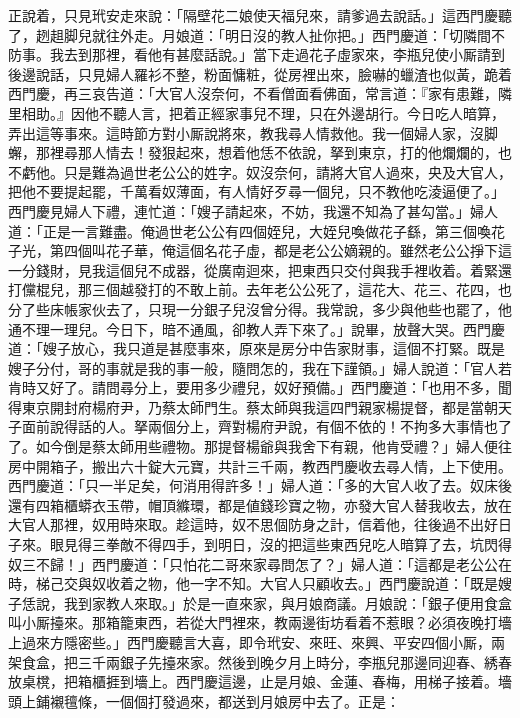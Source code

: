 正說着，只見玳安走來說：「隔壁花二娘使天福兒來，請爹過去說話。」這西門慶聽了，趔趄脚兒就往外走。月娘道：「明日沒的教人扯你把。」西門慶道：「切隣間不防事。我去到那裡，看他有甚麼話說。」當下走過花子虛家來，李瓶兒使小厮請到後邊說話，只見婦人羅衫不整，粉面慵粧，從房裡出來，臉嚇的蠟渣也似黃，跪着西門慶，再三哀告道：「大官人沒奈何，不看僧面看佛面，{}常言道：『家有患難，隣里相助。』因他不聽人言，把着正經家事兒不理，只在外邊胡行。今日吃人暗算，弄出這等事來。這時節方對小厮說將來，教我尋人情救他。我一個婦人家，沒脚蠏，那裡尋那人情去！發狠起來，想着他恁不依說，拏到東京，打的他爛爛的，也不虧他。{}只是難為過世老公公的姓字。奴沒奈何，請將大官人過來，央及大官人，把他不要提起罷，千萬看奴薄面，有人情好歹尋一個兒，只不教他吃淩逼便了。」西門慶見婦人下禮，連忙道：「嫂子請起來，不妨，我還不知為了甚勾當。」婦人道：「正是一言難盡。俺過世老公公有四個姪兒，大姪兒喚做花子繇，第三個喚花子光，第四個叫花子華，俺這個名花子虛，都是老公公嫡親的。雖然老公公掙下這一分錢財，見我這個兒不成器，從廣南迴來，把東西只交付與我手裡收着。着緊還打儻棍兒，那三個越發打的不敢上前。去年老公公死了，這花大、花三、花四，也分了些床帳家伙去了，只現一分銀子兒沒曾分得。我常說，多少與他些也罷了，他通不理一理兒。今日下，暗不通風，卻教人弄下來了。」說畢，放聲大哭。西門慶道：「嫂子放心，我只道是甚麼事來，原來是房分中告家財事，這個不打緊。既是嫂子分付，哥的事就是我的事一般，隨問怎的，我在下謹領。」婦人說道：「官人若肯時又好了。請問尋分上，要用多少禮兒，奴好預備。」西門慶道：「也用不多，聞得東京開封府楊府尹，乃蔡太師門生。蔡太師與我這四門親家楊提督，都是當朝天子面前說得話的人。拏兩個分上，齊對楊府尹說，有個不依的！不拘多大事情也了了。如今倒是蔡太師用些禮物。那提督楊爺與我舍下有親，他肯受禮？」婦人便往房中開箱子，搬出六十錠大元寶，共計三千兩，教西門慶收去尋人情，上下使用。西門慶道：「只一半足矣，何消用得許多！」婦人道：「多的大官人收了去。奴床後還有四箱櫃蟒衣玉帶，帽頂縧環，都是値錢珍寶之物，亦發大官人替我收去，放在大官人那裡，奴用時來取。{}趁這時，奴不思個防身之計，信着他，往後過不出好日子來。眼見得三拳敵不得四手，到明日，沒的把這些東西兒吃人暗算了去，坑閃得奴三不歸！」西門慶道：「只怕花二哥來家尋問怎了？」婦人道：「這都是老公公在時，梯己交與奴收着之物，他一字不知。大官人只顧收去。」西門慶說道：「既是嫂子恁說，我到家教人來取。」於是一直來家，與月娘商議。月娘說：「銀子便用食盒叫小厮擡來。那箱籠東西，若從大門裡來，教兩邊街坊看着不惹眼？必須夜晚打墻上過來方隱密些。」西門慶聽言大喜，即令玳安、來旺、來興、平安四個小厮，兩架食盒，把三千兩銀子先擡來家。然後到晚夕月上時分，李瓶兒那邊同迎春、綉春放桌櫈，把箱櫃捱到墻上。西門慶這邊，止是月娘、金蓮、春梅，用梯子接着。墻頭上鋪襯氊條，一個個打發過來，都送到月娘房中去了。正是：

